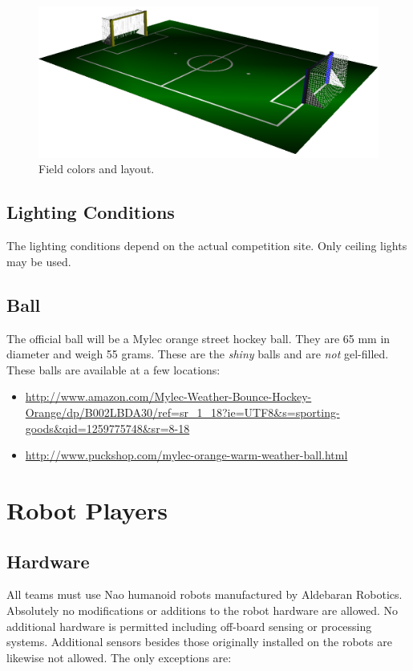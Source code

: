 \documentclass[12pt]{article}
\begin{document}
\begin{figure}[t]
\centerline{\includegraphics[width=\columnwidth]{figs/emptyfield_2010.png}}
\caption{Field colors and layout.}
\label{fig:field_color}
\end{figure}

\subsection{Lighting Conditions}

The lighting conditions depend on the actual competition site. Only ceiling lights may be used.

\subsection{Ball}
\label{sec:ball}

The official ball will be a Mylec orange street hockey ball. They are 65 mm in diameter and weigh 55 grams. These are the \emph{shiny} balls and are \emph{not} gel-filled. These balls are available at a few locations:
\begin{itemize}
\item \url{http://www.amazon.com/Mylec-Weather-Bounce-Hockey-Orange/dp/B002LBDA30/ref=sr\_1\_18?ie=UTF8\&s=sporting-goods\&qid=1259775748\&sr=8-18}
\item \url{http://www.puckshop.com/mylec-orange-warm-weather-ball.html}
\end{itemize}


\section{Robot Players}

\subsection{Hardware}

All teams must use Nao humanoid robots manufactured by Aldebaran Robotics. Absolutely no modifications or additions to the robot hardware are allowed. No additional hardware is permitted including off-board sensing or processing systems. Additional sensors besides those originally installed on the robots are likewise not allowed. The only exceptions are:
\end{document}
